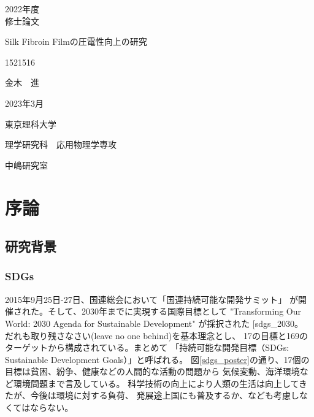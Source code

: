 \documentclass[dvipdfmx,12pt,a4paper]{jreport}
\makeatletter
\DeclareRobustCommand\cite{\unskip
    	\@ifnextchar[{\@tempswatrue\@citex}{\@tempswafalse\@citex[]}}
\makeatother
\begin{document}
	\begin{titlepage}
		
		\begin{center}
			
			\vspace{20truept}
			{\LARGE 2022年度}\\
			\vspace{15truept}
			{\LARGE 修士論文}
			
			\vspace{50truept}
			
			{\Huge Silk Fibroin Filmの圧電性向上の研究}\\
			\vspace{10truept}
			
			\vspace*{280truept}
			
			{\LARGE 1521516}\\
			\vspace{5truept}
			
			{\LARGE 金木　進}\\
			\vspace{60truept}
			
			{\LARGE 2023年3月}
			\vspace{30truept}
			
			{\LARGE 東京理科大学}\\
			\vspace{15truept}
			
			{\LARGE 理学研究科　応用物理学専攻}\\
			\vspace{15truept}
			
			{\LARGE 中嶋研究室}\\
			
		\end{center}
		
		
	\end{titlepage}
  \thispagestyle{empty}
	\clearpage
\addtocounter{page}{0}
\tableofcontents
  \chapter{序論}
		\section{研究背景}
		\subsection{SDGs}
		2015年9月25日-27日、国連総会において「国連持続可能な開発サミット」
		が開催された。そして、2030年までに実現する国際目標として
		 "Transforming Our World: 2030 Agenda for Sustainable Development" が採択された\cite{sdgs_2030}。
		だれも取り残さなさい(leave no one behind)を基本理念とし、
		17の目標と169のターゲットから構成されている。まとめて
		「持続可能な開発目標（SDGs: Sustainable Development Goals）」と呼ばれる。
		図\ref{sdgs_poster}の通り、17個の目標は貧困、紛争、健康などの人間的な活動の問題から
		気候変動、海洋環境など環境問題まで言及している。
		科学技術の向上により人類の生活は向上してきたが、今後は環境に対する負荷、
		発展途上国にも普及するか、なども考慮しなくてはならない。
		\\
		\\
\end{document}
